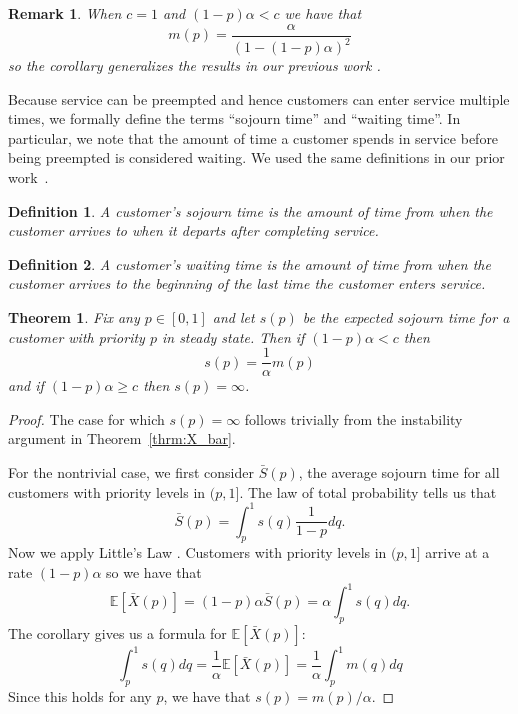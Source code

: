 \documentclass[conference]{IEEEtran}
\newtheorem{definition}{Definition}
\newtheorem{theorem}{Theorem}
\newtheorem{remark}{Remark}
\newcommand{\E}{\mathbb{E}}
\begin{document}
\begin{remark}
  When $c = 1$ and $(1-p)\alpha < c$ we have that
  \begin{equation}
    m(p) = \frac{\alpha}{(1 - (1-p)\alpha)^2}
  \end{equation}
  so the corollary generalizes the results in our previous work
  \cite{Master_ACC_2017}.
\end{remark}

Because service can be preempted and hence customers can enter service
multiple times, we formally define the terms ``sojourn time'' and
``waiting time''. In particular, we note that the amount of time a
customer spends in service before being preempted is considered
waiting. We used the same definitions in our prior
work~\cite{Master_ACC_2017}.
\begin{definition}
  A customer's sojourn time is the amount of time from when the customer arrives
  to when it departs after completing service.
\end{definition}
\begin{definition}
  A customer's waiting time is the amount of time from when the customer arrives
  to the beginning of the last time the customer enters service.
\end{definition}

\begin{theorem}
  Fix any $p \in [0, 1]$ and let $s(p)$ be the expected sojourn time
  for a customer with priority $p$ in steady state. Then if
  $(1-p)\alpha < c$ then
  \begin{equation}
    s(p) = \frac{1}{\alpha}m(p)
  \end{equation}
  and if $(1-p)\alpha \geq c$ then $s(p) = \infty$.
\end{theorem}
\begin{proof}
  The case for which $s(p) = \infty$ follows trivially from the
  instability argument in Theorem~\ref{thrm:X_bar}.

  For the nontrivial case, we first consider $\bar S(p)$, the average
  sojourn time for all customers with priority levels in $(p, 1]$. The
  law of total probability tells us that
  \begin{equation}
    \bar S(p) = \int_p^1 s(q) \frac{1}{1 - p} dq.
  \end{equation}
  Now we apply Little's Law \cite{Little_1961}. Customers with
  priority levels in $(p, 1]$ arrive at a rate $(1-p)\alpha$ so we
  have that
  \begin{equation}
    \E[\bar X(p)] = (1-p)\alpha \bar S(p) = \alpha \int_p^1 s(q) dq.
  \end{equation}
  The corollary gives us a formula for $\E[\bar X(p)]$:
  \begin{equation}
    \int_p^1 s(q)dq = \frac{1}{\alpha}\E[\bar X(p)] = \frac{1}{\alpha}\int_p^1 m(q)dq
  \end{equation}
  Since this holds for any $p$, we have that $s(p) = m(p)/\alpha$.
\end{proof}
\end{document}
